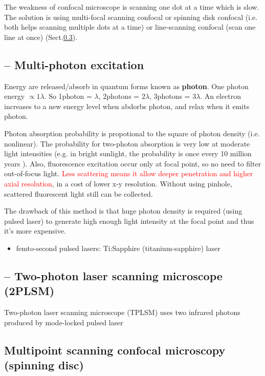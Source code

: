 The weakness of confocal microscope is scanning one dot at a time which is slow.
The solution is using multi-focal scanning confocal or spinning disk
confocal (i.e. both helps scanning multiple dots at a time) or line-scanning
confocal (scan one line at once)
(Sect.\ref{sec:multipoint_scanning_microscopy}).

\subsection{-- Multi-photon excitation}

Energy are released/absorb in quantum forms known as {\bf photon}. One photon
energy $\propto 1\lambda$. So 1photon = $\lambda$, 2photons = $2\lambda$,
3photons = $3\lambda$. An electron increases to a new
energy level when abdorbs photon, and relax when it emits photon. 

Photon absorption probability is propotional to the square of photon density
(i.e. nonlinear). The probability for two-photon absorption is very low at
moderate light intensities (e.g. in bright sunlight, the probability is once
every 10 million years \citep{denk1997}). Also, fluorescence excitation occur
only at focal point, so no need to filter out-of-focus light.
\textcolor{red}{Less scattering means it allow deeper penetration and higher
axial resolution}, in a cost of lower x-y resolution.
Without using pinhole, scattered fluorescent light still can be collected.

The drawback of this method is that huge photon density is required (using
pulsed laser) to generate high enough light intensity at the focal point and
thus it's more expensive.
\begin{itemize}
  \item femto-second pulsed lasers: Ti:Sapphire (titanium-sapphire) laser
\end{itemize}

\subsection{-- Two-photon laser scanning microscope (2PLSM)}

Two-photon laser scanning microscope (TPLSM) uses two infrared photons produced
by mode-locked pulsed laser 

\subsection{Multipoint scanning confocal microscopy (spinning disc)}
\label{sec:multipoint_scanning_microscopy}

